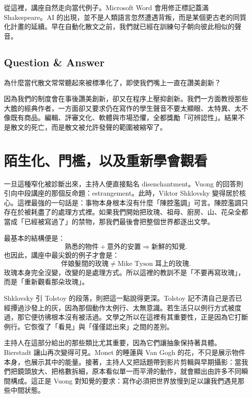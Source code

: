 從這裡，講座自然走向當代例子。Microsoft Word 會用修正標記蓋滿 Shakespeare。AI 的出現，並不是人類語言忽然遭遇背叛，而是某個更古老的同質化計畫的延續。早在自動化散文之前，我們就已經在訓練句子朝向彼此相似的聲音。

\subsection{Question \& Answer}

為什麼當代散文常常聽起來被標準化了，即使我們嘴上一直在讚美創新？

因為我們的制度會在事後讚美創新，卻又在程序上壓抑創新。我們一方面教授那些大膽的經典作者，一方面卻又要求仍在寫作的學生聲音不要太顯眼、太特異、太不像既有商品。編輯、評審文化、軟體與市場恐懼，全都獎勵「可辨認性」。結果不是散文的死亡，而是散文被允許發聲的範圍被縮窄了。

\section{陌生化、門檻，以及重新學會觀看}

一旦這種窄化被診斷出來，主持人便直接點名 disenchantment。Vuong 的回答則引向中段講座的那個反命題：estrangement。此時，Viktor Shklovsky 變得居於核心。這裡最強的一句話是：事物本身根本沒有什麼「陳腔濫調」可言。陳腔濫調只存在於被耗盡了的處理方式裡。如果我們開始把玫瑰、祖母、廚房、山、花朵全都當成「已經被寫過了」的禁物，那我們最後會把整個世界都逐出文學。

最基本的結構便是：
\begin{equation}
\text{熟悉的物件} + \text{意外的安置} \Longrightarrow \text{新鮮的知覺}.
\end{equation}
也因此，講座中最尖銳的例子才會是：
\begin{equation}
\text{伴娘髮間的玫瑰} \neq \text{Mike Tyson 耳上的玫瑰}.
\end{equation}
玫瑰本身完全沒變，改變的是處理方式。所以這裡的教訓不是「不要再寫玫瑰」，而是「重新觀看那朵玫瑰」。

Shklovsky 引 Tolstoy 的段落，則把這一點說得更深。Tolstoy 記不清自己是否已經撢過沙發上的灰，因為那個動作太例行、太無意識。若生活只以例行方式被度過，那它便彷彿根本沒有被活過。文學之所以在這裡有其重要性，正是因為它打斷例行。它恢復了「看見」與「僅僅認出來」之間的差別。

主持人在這部分給出的那些類比尤其重要，因為它們讓抽象保持著具體。Bierstadt 讓山再次變得可見。Monet 的睡蓮與 Van Gogh 的花，不只是展示物件本身，也展示其中的能量。接著，主持人又把話題帶到影片剪輯與早期攝影：當我們把鏡頭放大、把格數拆細，原本看似單一而平滑的動作，就會顯出由許多不同瞬間構成。這正是 Vuong 對知覺的要求：寫作必須把世界放慢到足以讓我們遇見那些中間狀態。

